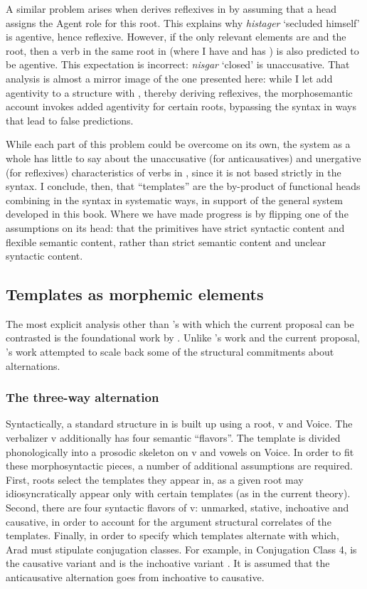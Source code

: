 A similar problem arises when \citet[60]{doron03} derives reflexives in {\thit} by assuming that a head  assigns the Agent role for this root. This explains why \emph{histager} `secluded himself' is agentive, hence reflexive. However, if the only relevant elements are {\vz} and the root, then a verb in the same root in {\tnif} (where I have {\vz} and \citealt{doron03} has ) is also predicted to be agentive. This expectation is incorrect: \emph{nisgar} `closed' is unaccusative. That analysis is almost a mirror image of the one presented here: while I let {\va} add agentivity to a structure with \vz, thereby deriving reflexives, the morphosemantic account invokes added agentivity for certain roots, bypassing the syntax in ways that lead to false predictions.

While each part of this problem could be overcome on its own, the system as a whole has little to say about the unaccusative (for anticausatives) and unergative (for reflexives) characteristics of verbs in {\thit}, since it is not based strictly in the syntax. I conclude, then, that ``templates'' are the by-product of functional heads combining in the syntax in systematic ways, in support of the general system developed in this book. Where we have made progress is by flipping one of the assumptions on its head: that the primitives have strict syntactic content and flexible semantic content, rather than strict semantic content and unclear syntactic content.

	\subsection{Templates as morphemic elements} \label{vz:others:morph}
The most explicit analysis other than \citeauthor{doron03}'s with which the current proposal can be contrasted is the foundational work by \cite{arad03,arad05}. Unlike \citeauthor{doron03}'s work and the current proposal, \cite{arad05}'s work attempted to scale back some of the structural commitments about alternations.

		\subsubsection{The three-way alternation}
Syntactically, a standard structure in \cite{arad05} is built up using a root, v and Voice. The verbalizer v additionally has four semantic ``flavors''. The template is divided phonologically into a prosodic skeleton on v and vowels on Voice. In order to fit these morphosyntactic pieces, a number of additional assumptions are required. First, roots select the templates they appear in, as a given root may idiosyncratically appear only with certain templates (as in the current theory). Second, there are four syntactic flavors of v: unmarked, stative, inchoative and causative, in order to account for the argument structural correlates of the templates. Finally, in order to specify which templates alternate with which, Arad must stipulate conjugation classes. For example, in Conjugation Class 4, {\tpie} is the causative variant and {\thit} is the inchoative variant \citep[220]{arad05}. It is assumed that the anticausative alternation goes from inchoative to causative.
		
